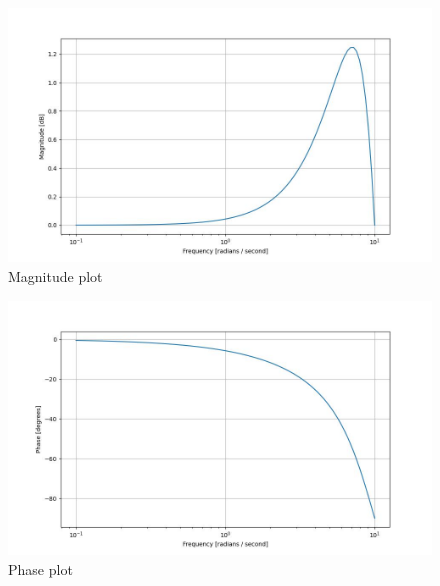 \documentclass[journal,12pt,twocolumn]{IEEEtran}
\theoremstyle{remark}
\begin{document}
\begin{figure}[!ht]
\centering
\begin{center}
\includegraphics[width=\columnwidth]{2022/EE/39/figs/Figure_1.jpg}
\end{center}
\caption{Magnitude plot}
\end{figure}
\begin{figure}[!ht]
\centering
\begin{center}
\includegraphics[width=\columnwidth]{2022/EE/39/figs/Figure_2.jpg}
\end{center}
\caption{Phase plot}
\end{figure}
\end{document}
